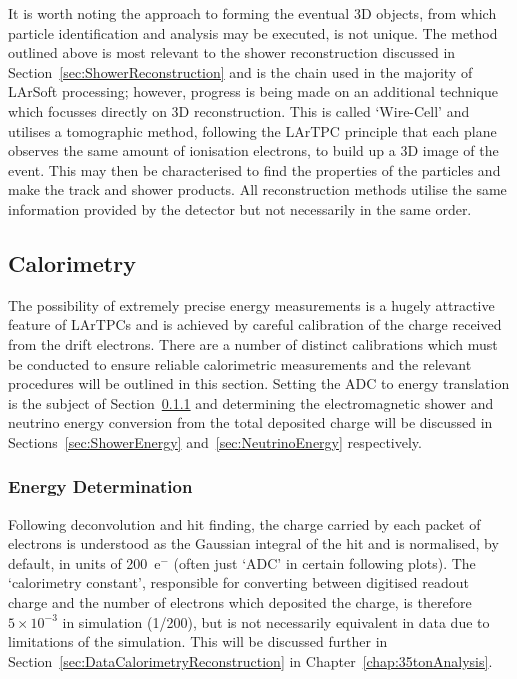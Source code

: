 It is worth noting the approach to forming the eventual 3D objects, from which particle identification and analysis may be executed, is not unique.  The method outlined above is most relevant to the shower reconstruction discussed in Section~\ref{sec:ShowerReconstruction} and is the chain used in the majority of LArSoft processing; however, progress is being made on an additional technique which focusses directly on 3D reconstruction.  This is called `Wire-Cell' \cite{WireCellWebsite} and utilises a tomographic method, following the LArTPC principle that each plane observes the same amount of ionisation electrons, to build up a 3D image of the event.  This may then be characterised to find the properties of the particles and make the track and shower products.  All reconstruction methods utilise the same information provided by the detector but not necessarily in the same order.

\subsection{Calorimetry}\label{sec:Calorimetry}

The possibility of extremely precise energy measurements is a hugely attractive feature of LArTPCs and is achieved by careful calibration of the charge received from the drift electrons.  There are a number of distinct calibrations which must be conducted to ensure reliable calorimetric measurements and the relevant procedures will be outlined in this section.  Setting the ADC to energy translation is the subject of Section~\ref{sec:EnergyDetermination} and determining the electromagnetic shower and neutrino energy conversion from the total deposited charge will be discussed in Sections~\ref{sec:ShowerEnergy} and~\ref{sec:NeutrinoEnergy} respectively.

\subsubsection{Energy Determination}\label{sec:EnergyDetermination}

Following deconvolution and hit finding, the charge carried by each packet of electrons is understood as the Gaussian integral of the hit and is normalised, by default, in units of 200~e$^-$ (often just `ADC' in certain following plots).  The `calorimetry constant', responsible for converting between digitised readout charge and the number of electrons which deposited the charge, is therefore $5\times10^{-3}$ in simulation (1/200), but is not necessarily equivalent in data due to limitations of the simulation.  This will be discussed further in Section~\ref{sec:DataCalorimetryReconstruction} in Chapter~\ref{chap:35tonAnalysis}.

